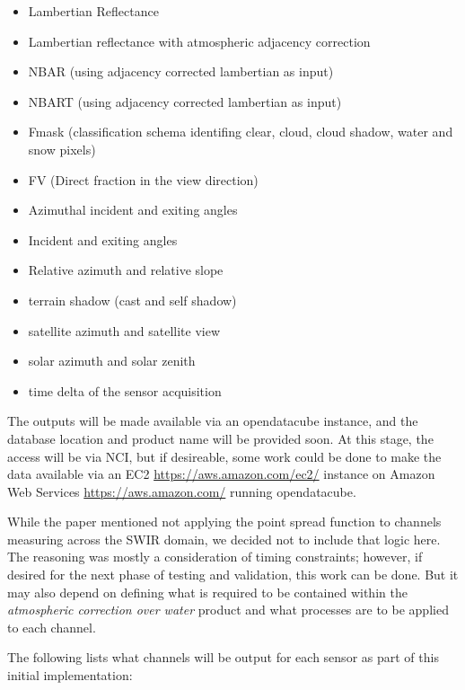 \documentclass[a4paper]{article}
\begin{document}
      \begin{itemize}
        \item \small{Lambertian Reflectance}
        \item \small{Lambertian reflectance with atmospheric adjacency correction}
        \item \small{NBAR (using adjacency corrected lambertian as input)}
        \item \small{NBART (using adjacency corrected lambertian as input)}
        \item \small{Fmask (classification schema identifing clear, cloud, cloud shadow, water and snow pixels)}
        \item \small{FV (Direct fraction in the view direction)}
        \item \small{Azimuthal incident and exiting angles}
        \item \small{Incident and exiting angles}
        \item \small{Relative azimuth and relative slope}
        \item \small{terrain shadow (cast and self shadow)}
        \item \small{satellite azimuth and satellite view}
        \item \small{solar azimuth and solar zenith}
        \item \small{time delta of the sensor acquisition}
      \end{itemize}

    \begin{flushleft}
      The outputs will be made available via an opendatacube instance, and the database location and product name will be provided soon. At this stage, the access will be via NCI, but if desireable, some work could be done to make the data available via an EC2 \url{https://aws.amazon.com/ec2/} instance on Amazon Web Services \url{https://aws.amazon.com/} running opendatacube. \par
      While the paper mentioned not applying the point spread function to channels measuring across the SWIR domain, we decided not to include that logic here. The reasoning was mostly a consideration of timing constraints; however, if desired for the next phase of testing and validation, this work can be done. But it may also depend on defining what is required to be contained within the \textit{atmospheric correction over water} product and what processes are to be applied to each channel. \par

    \clearpage

      The following lists what channels will be output for each sensor as part of this initial implementation:
    \end{flushleft}
\end{document}
